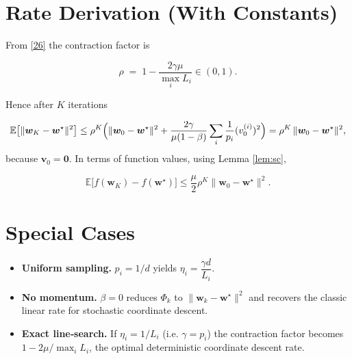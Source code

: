 \documentclass{article}
\newcommand{\E}{\mathbb{E}}
\begin{document}
\section*{Rate Derivation (With Constants)}
From \eqref{26} the contraction factor is  

\[
\rho \;=\; 1-\frac{2\gamma\mu}{\max_i L_i}\in(0,1).
\]

Hence after $K$ iterations  

\[
\E\big[\|\bm w_K-\bm w^{\star}\|^{2}\big]\le \rho^{K}\Bigl(\|\bm w_0-\bm w^{\star}\|^{2}
+\frac{2\gamma}{\mu(1-\beta)}\sum_{i}\frac{1}{p_i}(v_0^{(i)})^{2}\Bigr)
= \rho^{K}\,\|\bm w_0-\bm w^{\star}\|^{2},
\]
because $\bm v_0=\bm 0$.  
In terms of function values, using Lemma \ref{lem:sc},

\[
\E\big[f(\bm w_K)-f(\bm w^{\star})\big]\le \frac{\mu}{2}\rho^{K}\|\bm w_0-\bm w^{\star}\|^{2}.
\]

\section*{Special Cases}
\begin{itemize}
\item \textbf{Uniform sampling.} $p_i=1/d$ yields $\eta_i = \dfrac{\gamma d}{L_i}$.
\item \textbf{No momentum.} $\beta=0$ reduces $\Phi_k$ to $\|\bm w_k-\bm w^{\star}\|^{2}$ and recovers the classic linear rate for stochastic coordinate descent.
\item \textbf{Exact line‑search.} If $\eta_i = 1/L_i$ (i.e. $\gamma = p_i$) the contraction factor becomes $1-2\mu/\max_i L_i$, the optimal deterministic coordinate descent rate.
\end{itemize}
\end{document}
